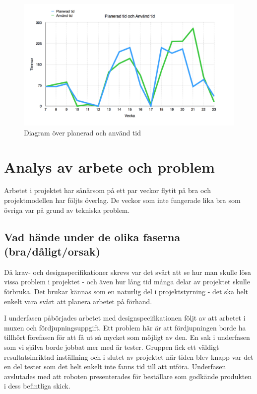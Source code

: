 \documentclass[a4paper,12pt,fleqn]{article}
\begin{document}
\begin{figure}[htp] %
  \begin{center}
  \includegraphics[keepaspectratio=true,scale=0.25]{tid.png}  %
  \end{center}
  \caption{Diagram över planerad och använd tid} %
  \label{fig:tid}
\end{figure}

\newpage

\section{Analys av arbete och problem}
Arbetet i projektet har sånärsom på ett par veckor flytit på bra och projektmodellen har följts överlag. De veckor som inte fungerade lika bra som övriga var på grund av tekniska problem.

\subsection{Vad hände under de olika faserna (bra/dåligt/orsak)}
Då krav- och designspecifikationer skrevs var det svårt att se hur man skulle lösa vissa problem i projektet - och även hur lång tid många delar av projektet skulle förbruka. Det brukar kännas som en naturlig del i projektstyrning - det ska helt enkelt vara svårt att planera arbetet på förhand. 

I underfasen påbörjades arbetet med designspecifikationen följt av att arbetet i muxen och fördjupningsuppgift. Ett problem här är att fördjupningen borde ha tillhört förefasen för att få ut så mycket som möjligt av den. En sak i underfasen som vi själva borde jobbat mer med är tester. Gruppen fick ett väldigt resultatsinriktad inställning och i slutet av projektet när tiden blev knapp var det en del tester som det helt enkelt inte fanns tid till att utföra. Underfasen avslutades med att roboten presenterades för beställare som godkände produkten i dess befintliga skick. 
\end{document}
